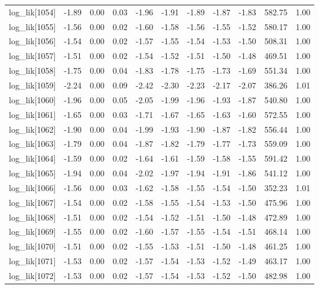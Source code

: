 \begin{table}[ht]
\begin{tabular}{rrrrrrrrrrr}
  log\_lik[1054] & -1.89 & 0.00 & 0.03 & -1.96 & -1.91 & -1.89 & -1.87 & -1.83 & 582.75 & 1.00 \\ 
  log\_lik[1055] & -1.56 & 0.00 & 0.02 & -1.60 & -1.58 & -1.56 & -1.55 & -1.52 & 580.17 & 1.00 \\ 
  log\_lik[1056] & -1.54 & 0.00 & 0.02 & -1.57 & -1.55 & -1.54 & -1.53 & -1.50 & 508.31 & 1.00 \\ 
  log\_lik[1057] & -1.51 & 0.00 & 0.02 & -1.54 & -1.52 & -1.51 & -1.50 & -1.48 & 469.51 & 1.00 \\ 
  log\_lik[1058] & -1.75 & 0.00 & 0.04 & -1.83 & -1.78 & -1.75 & -1.73 & -1.69 & 551.34 & 1.00 \\ 
  log\_lik[1059] & -2.24 & 0.00 & 0.09 & -2.42 & -2.30 & -2.23 & -2.17 & -2.07 & 386.26 & 1.01 \\ 
  log\_lik[1060] & -1.96 & 0.00 & 0.05 & -2.05 & -1.99 & -1.96 & -1.93 & -1.87 & 540.80 & 1.00 \\ 
  log\_lik[1061] & -1.65 & 0.00 & 0.03 & -1.71 & -1.67 & -1.65 & -1.63 & -1.60 & 572.55 & 1.00 \\ 
  log\_lik[1062] & -1.90 & 0.00 & 0.04 & -1.99 & -1.93 & -1.90 & -1.87 & -1.82 & 556.44 & 1.00 \\ 
  log\_lik[1063] & -1.79 & 0.00 & 0.04 & -1.87 & -1.82 & -1.79 & -1.77 & -1.73 & 559.09 & 1.00 \\ 
  log\_lik[1064] & -1.59 & 0.00 & 0.02 & -1.64 & -1.61 & -1.59 & -1.58 & -1.55 & 591.42 & 1.00 \\ 
  log\_lik[1065] & -1.94 & 0.00 & 0.04 & -2.02 & -1.97 & -1.94 & -1.91 & -1.86 & 541.12 & 1.00 \\ 
  log\_lik[1066] & -1.56 & 0.00 & 0.03 & -1.62 & -1.58 & -1.55 & -1.54 & -1.50 & 352.23 & 1.01 \\ 
  log\_lik[1067] & -1.54 & 0.00 & 0.02 & -1.58 & -1.55 & -1.54 & -1.53 & -1.50 & 475.96 & 1.00 \\ 
  log\_lik[1068] & -1.51 & 0.00 & 0.02 & -1.54 & -1.52 & -1.51 & -1.50 & -1.48 & 472.89 & 1.00 \\ 
  log\_lik[1069] & -1.55 & 0.00 & 0.02 & -1.60 & -1.57 & -1.55 & -1.54 & -1.51 & 468.14 & 1.00 \\ 
  log\_lik[1070] & -1.51 & 0.00 & 0.02 & -1.55 & -1.53 & -1.51 & -1.50 & -1.48 & 461.25 & 1.00 \\ 
  log\_lik[1071] & -1.53 & 0.00 & 0.02 & -1.57 & -1.54 & -1.53 & -1.52 & -1.49 & 463.17 & 1.00 \\ 
  log\_lik[1072] & -1.53 & 0.00 & 0.02 & -1.57 & -1.54 & -1.53 & -1.52 & -1.50 & 482.98 & 1.00 \\ 

\end{tabular}
\end{table}
